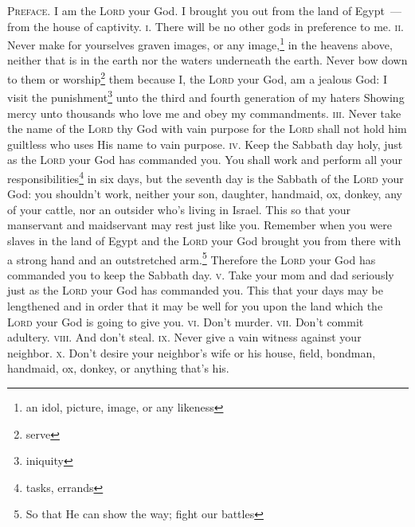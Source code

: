 
\begin{inparaenum}
     \textsc{Preface.} I am the \textsc{Lord} your God. I brought you out from the land of Egypt~--- from the house of captivity.%
     \textsc{i.} There will be no other gods in preference to me.%
     \textsc{ii.} Never make for yourselves graven images, or any image,\footnote{an idol, picture, image, or any likeness} in the heavens above, neither that is in the earth nor the waters underneath the earth.%
     Never bow down to them or worship\footnote{serve} them because I, the \textsc{Lord} your God, am a jealous God: I visit the punishment\footnote{iniquity} unto the third and fourth generation of my haters%
     Showing mercy unto thousands who love me and obey my commandments.%
     \textsc{iii.} Never take the name of the \textsc{Lord} thy God with vain purpose for the \textsc{Lord} shall not hold him guiltless who uses His name to vain purpose.%
     \textsc{iv.} Keep the Sabbath day holy, just as the \textsc{Lord} your God has commanded you.%
     You shall work and perform all your responsibilities\footnote{tasks, errands} in six days,%
     but the seventh day is the Sabbath of the \textsc{Lord} your God: you shouldn't work, neither your son, daughter, handmaid, ox, donkey, any of your cattle, nor an outsider who's living in Israel. This so that your manservant and maidservant may rest just like you.%
     Remember when you were slaves in the land of Egypt and the \textsc{Lord} your God brought you from there with a strong hand and an outstretched arm.\footnote{So that He can show the way; fight our battles} Therefore the \textsc{Lord} your God has commanded you to keep the Sabbath day.%
     \textsc{v.} Take your mom and dad seriously just as the \textsc{Lord} your God has commanded you. This that your days may be lengthened and in order that it may be well for you upon the land which the \textsc{Lord} your God is going to give you.%
     \textsc{vi.} Don't murder.%
     \textsc{vii.} Don't commit adultery.%
     \textsc{viii.} And don't steal.%
     \textsc{ix.} Never give a vain witness against your neighbor.%
     \textsc{x.} Don't desire your neighbor's wife or his house, field, bondman, handmaid, ox, donkey, or anything that's his.%
\end{inparaenum}
